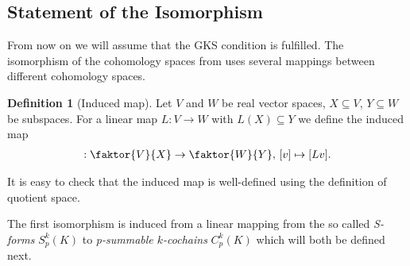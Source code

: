 \documentclass[12pt,a4paper]{article}
\theoremstyle{definition}
\newtheorem{definition}{Definition}
\begin{document}
\subsection{Statement of the Isomorphism} \label{sec_isomorphism_cohomology}

From now on we will assume that the GKS condition is fulfilled.
The isomorphism of the cohomology spaces from \cite{goldshtein} uses several
mappings between different cohomology spaces. 

\begin{definition}[Induced map]
    Let $V$ and $W$ be real vector spaces, $X \subseteq V$, $Y \subseteq W$ be 
    subspaces. For a linear map $L: V \rightarrow W$ with $L(X) \subseteq Y$ 
    we define the induced map
    \begin{align*}
        [L]: \faktor{V}{X} \rightarrow \faktor{W}{Y},\,
        [v] \mapsto [Lv].
    \end{align*}     
\end{definition}
It is easy to check that the induced map is well-defined using the
definition of quotient space. %


The first isomorphism is induced from a linear mapping
from the so called \textit{S-forms} 
$S_p^k(K)$ to \textit{p-summable $k$-cochains} $C_p^k(K)$ which will both 
be defined next.
\end{document}
